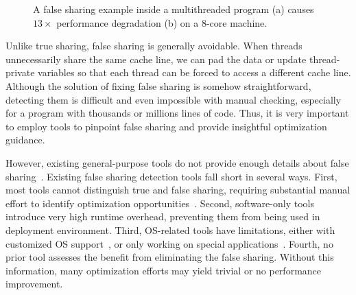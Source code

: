 \begin{figure}[htbp]
\centering
{}%
\hspace{20pt}
\caption{
A false sharing example inside a multithreaded program (a) causes $13\times$ performance degradation (b) on a 8-core machine.
\label{fig:penalty}}
\end{figure}


Unlike true sharing, false sharing is generally avoidable. When threads unnecessarily share the same cache line, we can pad the data or update thread-private variables so that each thread can be forced to access a different cache line. Although the solution of fixing false sharing is somehow straightforward, detecting them is difficult and even impossible with manual checking, especially for a program with thousands or millions lines of code. Thus, it is very important to employ tools to pinpoint false sharing and provide insightful optimization guidance.

However, existing general-purpose tools do not provide enough details about false sharing~\cite{gprof, ibs-sc, Intel:VTune}. Existing false sharing detection tools fall short in several ways. First, most tools cannot distinguish true and false sharing, requiring substantial manual effort to identify optimization opportunities~\cite{falseshare:binaryinstrumentation1,detect:ptu,detect:intel,falseshare:binaryinstrumentation2,DProf, qinzhao, OSdetection, mldetect, Wicaksono11detectingfalse, openmp}. Second, software-only tools~\cite{falseshare:binaryinstrumentation1,falseshare:binaryinstrumentation2,falseshare:simulator, Predator} introduce very high runtime overhead, preventing them from being used in deployment environment. Third, OS-related tools have limitations, either with customized OS support~\cite{OSdetection}, or only working on special applications~\cite{Sheriff}. Fourth, no prior tool assesses the benefit from eliminating the false sharing. Without this information, many optimization efforts may yield trivial or no performance improvement.


